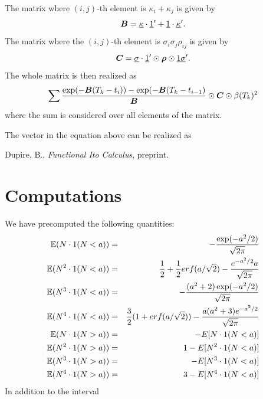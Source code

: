 \documentclass[12pt]{article}
\begin{document}
The matrix where $(i,j)$-th element is $\kappa_i + \kappa_j $ is given 
by 
\begin {eqnarray*} 
  \mbox {\boldmath ${B}$} = \underline {\kappa} \cdot \underline {1}' + \underline {1} \cdot \underline {\kappa}' .
\end {eqnarray*}
The matrix where the $(i,j)$-th element is $\sigma_i \sigma_j \rho_{ij}$ is 
given by 
\begin {eqnarray*} 
  \mbox {\boldmath ${C}$} = \underline {\sigma} \cdot \underline {1}' \odot 
  \mbox {\boldmath ${\rho}$} \odot \underline {1} \underline {\sigma}' .
\end {eqnarray*}
The whole matrix is then realized as 
\begin {eqnarray*}
  \sum \frac {\exp ( - \mbox {\boldmath ${B}$} (T_k - t_i) ) - \exp ( - \mbox {\boldmath ${B}$} (T_k - t_{i-1} )} 
  { \mbox {\boldmath ${B}$} }  \odot \mbox {\boldmath ${C}$} \odot \beta (T_k)^2
\end {eqnarray*}
where the sum is considered over all elements of the matrix.

The vector in the equation above can be realized as 


%
%

















\begin{thebibliography}{10}

 Dupire, B., {\it Functional Ito Calculus}, preprint.


\end{thebibliography}


\appendix

\section {Computations} 
We have precomputed the following quantities:
\begin {eqnarray*}
  \mathbb {E} (N \cdot 1 (N < a) ) & = & - \frac { \exp (- a^2 /2 ) } { \sqrt { 2 \pi } }
  \\
  \mathbb {E} (N^2 \cdot 1 (N < a) ) & = & \frac 1 2 + \frac 1 2 erf ( a / \sqrt {2} ) -
  \frac { e^{-a^2/2} a } {\sqrt {2 \pi} }   
  \\
  \mathbb {E} (N^3 \cdot 1 (N < a) ) & = & - \frac { (a^2 + 2) \exp (- a^2 /2 ) } { \sqrt { 2 \pi } }
  \\
  \mathbb {E} (N^4 \cdot 1 (N < a) ) & = & \frac 3 2 ( 1 + erf (a / \sqrt { 2} ) ) - 
  \frac { a (a^2 + 3) e^{-a^2/2} } { \sqrt { 2 \pi } }
  \\
  \mathbb {E} (N \cdot 1 (N > a) ) & = & - E[N \cdot 1 (N<a) ]   
  \\
  \mathbb {E} (N^2 \cdot 1 (N > a) ) & = & 1 - E[N^2 \cdot 1 (N<a) ]   
  \\
  \mathbb {E} (N^3 \cdot 1 (N > a) ) & = & - E[N^3 \cdot 1 (N<a) ]   
  \\
  \mathbb {E} (N^4 \cdot 1 (N > a) ) & = & 3 - E[N^4 \cdot 1 (N<a) ]   
\end {eqnarray*}
In addition to the interval 
\end{document}
